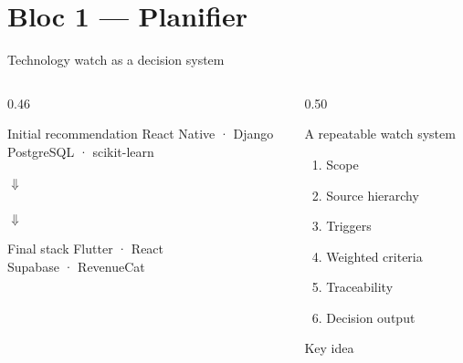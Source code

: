 \section{Bloc 1 — Planifier}


\begin{frame}{Technology watch as a decision system}
\begin{columns}[T]
\begin{column}{0.46\linewidth}
\begin{block}{Initial recommendation}
\centering\large React Native · Django\\PostgreSQL · scikit-learn
\end{block}
\vspace{0.25em}
\begin{center}{\Large$\Downarrow$}\\[-0.1em]\small{}\\[-0.1em]{\Large$\Downarrow$}\end{center}
\begin{block}{Final stack}
\centering\large Flutter · React\\Supabase · RevenueCat
\end{block}
\end{column}
\begin{column}{0.50\linewidth}
\begin{block}{A repeatable watch system}
\small
\begin{enumerate}
  \item Scope
  \item Source hierarchy
  \item Triggers
  \item Weighted criteria
  \item Traceability
  \item Decision output
\end{enumerate}
\end{block}
\vspace{0.35em}
\begin{block}{Key idea}
\centering{}
\end{block}
\end{column}
\end{columns}
\end{frame}

